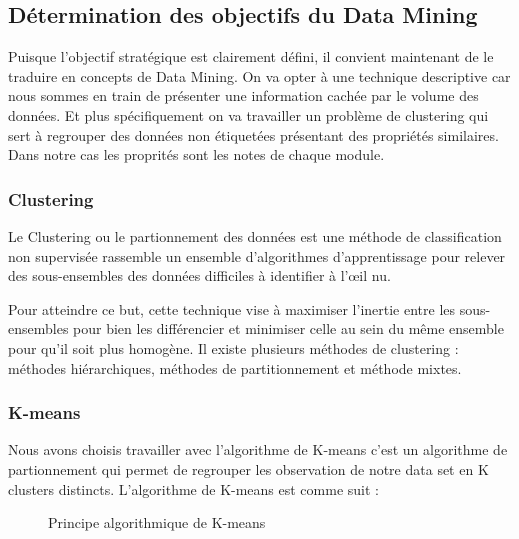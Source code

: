 \documentclass{article}
\begin{document}
            \subsection{Détermination des objectifs du Data Mining}
                Puisque l’objectif stratégique est clairement défini, il convient maintenant de le traduire en concepts de Data Mining. On va opter à une technique descriptive car nous sommes en train de présenter une information cachée par le volume des données. Et plus spécifiquement on va travailler un problème de clustering qui sert à regrouper des données non étiquetées présentant des propriétés similaires. Dans notre cas les proprités sont les notes de chaque module.\\
                \subsubsection{Clustering}
                    Le Clustering ou le partionnement des données est une méthode de classification non supervisée rassemble un ensemble d’algorithmes d’apprentissage pour relever des sous-ensembles des données difficiles à identifier à l’œil nu.\par
                    Pour atteindre ce but, cette technique vise à maximiser l’inertie entre les sous-ensembles pour bien les différencier et minimiser celle au sein du même ensemble pour qu’il soit plus homogène. Il existe plusieurs méthodes de clustering : méthodes hiérarchiques, méthodes de partitionnement et méthode mixtes.\\
                \subsubsection{K-means}
                    Nous avons  choisis travailler avec l’algorithme de K-means c’est un algorithme de partionnement qui permet de regrouper les observation de notre data set en K clusters distincts. L’algorithme de K-means est comme suit :\\
                    \begin{figure}[h!]
                        \centering
                        \caption{Principe algorithmique de K-means}
                        \label{fig:Kmeans}
                    \end{figure}
    \newpage
\end{document}
